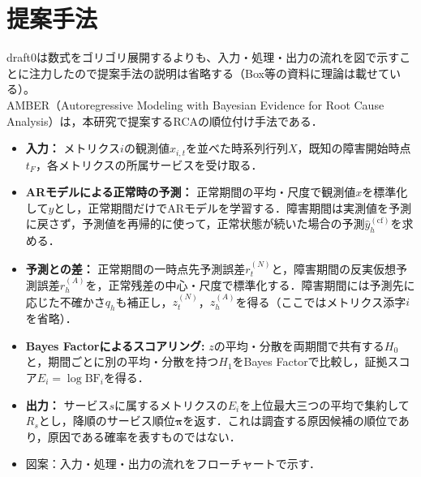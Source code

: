 \section{提案手法}
\label{sec:method}
\label{sec:method-bf}

draft0は数式をゴリゴリ展開するよりも、入力・処理・出力の流れを図で示すことに注力したので提案手法の説明は省略する（Box等の資料に理論は載せている）。\\
AMBER（Autoregressive Modeling with Bayesian Evidence for Root Cause Analysis）は，本研究で提案するRCAの順位付け手法である．
\begin{itemize}
    \item \textbf{入力：} メトリクス$i$の観測値$x_{i,t}$を並べた時系列行列$X$，既知の障害開始時点$t_F$，各メトリクスの所属サービスを受け取る．
    \item \textbf{ARモデルによる正常時の予測：} 正常期間の平均・尺度で観測値$x$を標準化して$y$とし，正常期間だけでARモデルを学習する．障害期間は実測値を予測に戻さず，予測値を再帰的に使って，正常状態が続いた場合の予測$\widehat{y}^{(\mathrm{cf})}_h$を求める．
    \item \textbf{予測との差：} 正常期間の一時点先予測誤差$r^{(N)}_t$と，障害期間の反実仮想予測誤差$r^{(A)}_h$を，正常残差の中心・尺度で標準化する．障害期間には予測先に応じた不確かさ$q_h$も補正し，$z^{(N)}_t$，$z^{(A)}_h$を得る（ここではメトリクス添字$i$を省略）．
    \item \textbf{Bayes Factorによるスコアリング:} $z$の平均・分散を両期間で共有する$H_0$と，期間ごとに別の平均・分散を持つ$H_1$をBayes Factorで比較し，証拠スコア$E_i=\log\mathrm{BF}_i$を得る．
    \item \textbf{出力：} サービス$s$に属するメトリクスの$E_i$を上位最大三つの平均で集約して$R_s$とし，降順のサービス順位$\boldsymbol{\pi}$を返す．これは調査する原因候補の順位であり，原因である確率を表すものではない．
    \item 図案：入力・処理・出力の流れをフローチャートで示す．
\end{itemize}
